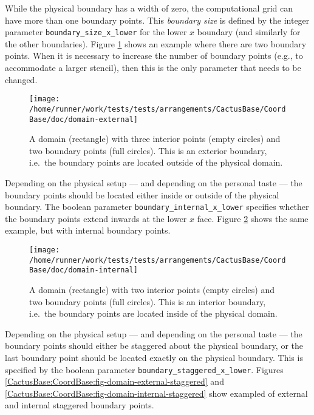 While the physical boundary has a width of zero, the computational
grid can have more than one boundary points.  This {\emph{boundary
size}} is defined by the integer parameter
{\texttt{boundary\_size\_x\_lower}} for the lower $x$ boundary (and
similarly for the other boundaries).  Figure
{\ref{CactusBase:CoordBase:fig-domain-external}} shows an example
where there are two boundary points.  When it is necessary to increase
the number of boundary points (e.g., to accommodate a larger stencil),
then this is the only parameter that needs to be changed.

\begin{figure}
\begin{center}
\texttt{[image: /home/runner/work/tests/tests/arrangements/CactusBase/CoordBase/doc/domain-external]}
\end{center}
\caption{A domain (rectangle) with three interior points (empty
circles) and two boundary points (full circles).  This is an exterior
boundary, i.e.\ the boundary points are located outside of the
physical domain.}
\label{CactusBase:CoordBase:fig-domain-external}
\end{figure}

Depending on the physical setup --- and depending on the personal
taste --- the boundary points should be located either inside or
outside of the physical boundary.  The boolean parameter
{\texttt{boundary\_internal\_x\_lower}} specifies whether the boundary
points extend inwards at the lower $x$ face.  Figure
{\ref{CactusBase:CoordBase:fig-domain-internal}} shows the same
example, but with internal boundary points.

\begin{figure}
\begin{center}
\texttt{[image: /home/runner/work/tests/tests/arrangements/CactusBase/CoordBase/doc/domain-internal]}
\end{center}
\caption{A domain (rectangle) with two interior points (empty circles)
and two boundary points (full circles).  This is an interior boundary,
i.e.\ the boundary points are located inside of the physical domain.}
\label{CactusBase:CoordBase:fig-domain-internal}
\end{figure}

Depending on the physical setup --- and depending on the personal
taste --- the boundary points should either be staggered about the
physical boundary, or the last boundary point should be located
exactly on the physical boundary.  This is specified by the boolean
parameter {\texttt{boundary\_staggered\_x\_lower}}.  Figures
{\ref{CactusBase:CoordBase:fig-domain-external-staggered}} and
{\ref{CactusBase:CoordBase:fig-domain-internal-staggered}} show
exampled of external and internal staggered boundary points.

